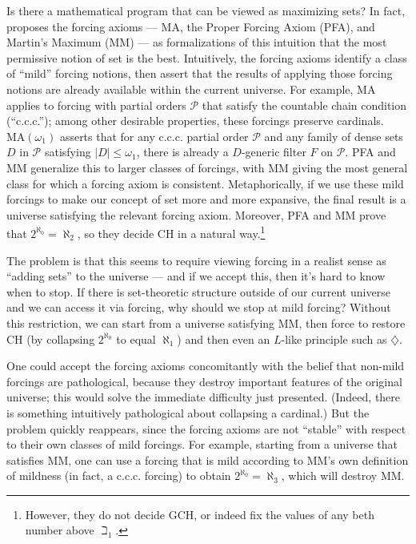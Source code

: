 \documentclass[letterpaper,12pt]{article}
\begin{document}
Is there a mathematical program that can be viewed as maximizing sets? In fact, \cite{magidor2012some} proposes the forcing axioms --- MA, the Proper Forcing Axiom (PFA), and Martin's Maximum (MM) --- as formalizations of this intuition that the most permissive notion of set is the best. Intuitively, the forcing axioms identify a class of ``mild'' forcing notions, then assert that the results of applying those forcing notions are already available within the current universe. For example, MA applies to forcing with partial orders $\mathcal{P}$ that satisfy the countable chain condition (``c.c.c.''); among other desirable properties, these forcings preserve cardinals. $\mathrm{MA}(\omega_1)$ asserts that for any c.c.c. partial order $\mathcal{P}$ and any family of dense sets $D$ in $\mathcal{P}$ satisfying $|D| \leq \omega_1$, there is already a $D$-generic filter $F$ on $\mathcal{P}$. PFA and MM generalize this to larger classes of forcings, with MM giving the most general class for which a forcing axiom is consistent. Metaphorically, if we use these mild forcings to make our concept of set more and more expansive, the final result is a universe satisfying the relevant forcing axiom. Moreover, PFA and MM prove that $2^{\aleph_0} = \aleph_2$, so they decide CH in a natural way.\footnote{However, they do not decide GCH, or indeed fix the values of any beth number above $\beth_1$.}

The problem is that this seems to require viewing forcing in a realist sense as ``adding sets'' to the universe --- and if we accept this, then it's hard to know when to stop. If there is set-theoretic structure outside of our current universe and we can access it via forcing, why should we stop at mild forcing? Without this restriction, we can start from a universe satisfying MM, then force to restore CH (by collapsing $2^{\aleph_0}$ to equal $\aleph_1$) and then even an $L$-like principle such as $\diamondsuit$.

One could accept the forcing axioms concomitantly with the belief that non-mild forcings are pathological, because they destroy important features of the original universe; this would solve the immediate difficulty just presented. (Indeed, there is something intuitively pathological about collapsing a cardinal.) But the problem quickly reappears, since the forcing axioms are not ``stable'' with respect to their own classes of mild forcings. For example, starting from a universe that satisfies MM, one can use a forcing that is mild according to MM's own definition of mildness (in fact, a c.c.c. forcing) to obtain $2^{\aleph_0} = \aleph_3$, which will destroy MM.
\end{document}
